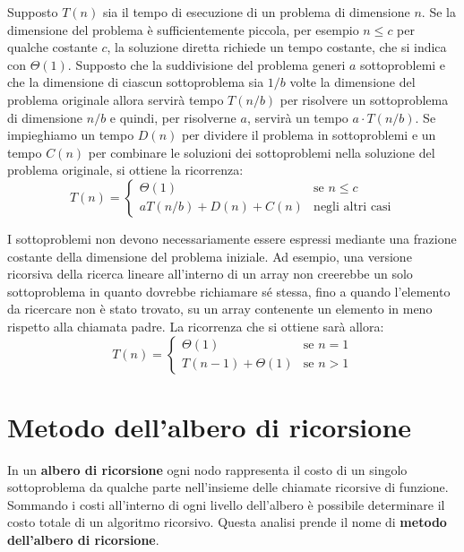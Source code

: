 \begin{example}
	Supposto $T(n)$ sia il tempo di esecuzione di un problema di dimensione $n$. Se la dimensione del problema è sufficientemente piccola, per esempio $n \leq c$ per qualche costante $c$, la soluzione diretta richiede un tempo costante, che si indica con $\Theta(1)$. Supposto che la suddivisione del problema generi $a$ sottoproblemi e che la dimensione di ciascun sottoproblema sia $1/b$ volte la dimensione del problema originale allora servirà tempo $T(n/b)$ per risolvere un sottoproblema di dimensione $n/b$ e quindi, per risolverne $a$, servirà un tempo $a \cdot T(n/b)$. Se impieghiamo un tempo $D(n)$ per dividere il problema in sottoproblemi e un tempo $C(n)$ per combinare le soluzioni dei sottoproblemi nella soluzione del problema originale, si ottiene la ricorrenza:
\begin{displaymath}
	T(n)=
	\begin{cases}
		\Theta(1) & \text{se } n\leq c \\
		aT(n/b)+D(n)+C(n) & \text{negli altri casi}
	\end{cases}
\end{displaymath}
\end{example}

I sottoproblemi non devono necessariamente essere espressi mediante una frazione costante della dimensione del problema iniziale. Ad esempio, una versione ricorsiva della ricerca lineare all'interno di un array non creerebbe un solo sottoproblema in quanto dovrebbe richiamare sé stessa, fino a quando l'elemento da ricercare non è stato trovato, su un array contenente un elemento in meno rispetto alla chiamata padre. La ricorrenza che si ottiene sarà allora:
\begin{displaymath}
	T(n) = \begin{cases}
		\Theta(1) & \text{se } n=1\\
		T(n-1)+\Theta(1) & \text{se } n>1
	\end{cases}
\end{displaymath}

\section{Metodo dell'albero di ricorsione}
In un \textbf{albero di ricorsione} ogni nodo rappresenta il costo di un singolo sottoproblema da qualche parte nell'insieme delle chiamate ricorsive di funzione. Sommando i costi all'interno di ogni livello dell'albero è possibile determinare il costo totale di un algoritmo ricorsivo. Questa analisi prende il nome di \textbf{metodo dell'albero di ricorsione}.

